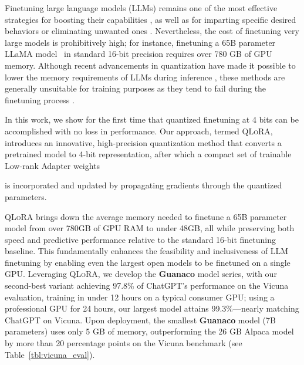 Finetuning large language models (LLMs) remains one of the most effective strategies for boosting their capabilities \citep{min2021metaicl, wei2021finetuned, ouyang2022training, wang2022super, wang2022self, liu2022few}, as well as for imparting specific desired behaviors or eliminating unwanted ones \citep{ouyang2022training,askell2021general,bai2022training}. Nevertheless, the cost of finetuning very large models is prohibitively high; for instance, finetuning a 65B parameter LLaMA model~\citep{touvron2023llama} in standard 16-bit precision requires over 780 GB of GPU memory. Although recent advancements in quantization have made it possible to lower the memory requirements of LLMs during inference \citep{dettmers2022llm, dettmers2022case, frantar2022gptq, xiao2022smoothquant}, these methods are generally unsuitable for training purposes as they tend to fail during the finetuning process \citep{wortsman2023stable}.

In this work, we show for the first time that quantized finetuning at 4 bits can be accomplished with no loss in performance. Our approach, termed \textsc{QLoRA}, introduces an innovative, high-precision quantization method that converts a pretrained model to 4-bit representation, after which a compact set of trainable Low-rank Adapter weights \citep{hu2021lora} 

is incorporated and updated by propagating gradients through the quantized parameters.

\textsc{QLoRA} brings down the average memory needed to finetune a 65B parameter model from over 780GB of GPU RAM to under 48GB, all while preserving both speed and predictive performance relative to the standard 16-bit finetuning baseline. This fundamentally enhances the feasibility and inclusiveness of LLM finetuning by enabling even the largest open models to be finetuned on a single GPU. Leveraging \textsc{QLoRA}, we develop the \textbf{Guanaco} model series, with our second-best variant achieving 97.8\% of ChatGPT’s performance on the Vicuna~\citep{vicuna2023} evaluation, training in under 12 hours on a typical consumer GPU; using a professional GPU for 24 hours, our largest model attains 99.3\%—nearly matching ChatGPT on Vicuna. Upon deployment, the smallest \textbf{Guanaco} model (7B parameters) uses only 5 GB of memory, outperforming the 26 GB Alpaca model by more than 20 percentage points on the Vicuna benchmark (see Table~\ref{tbl:vicuna_eval}).

